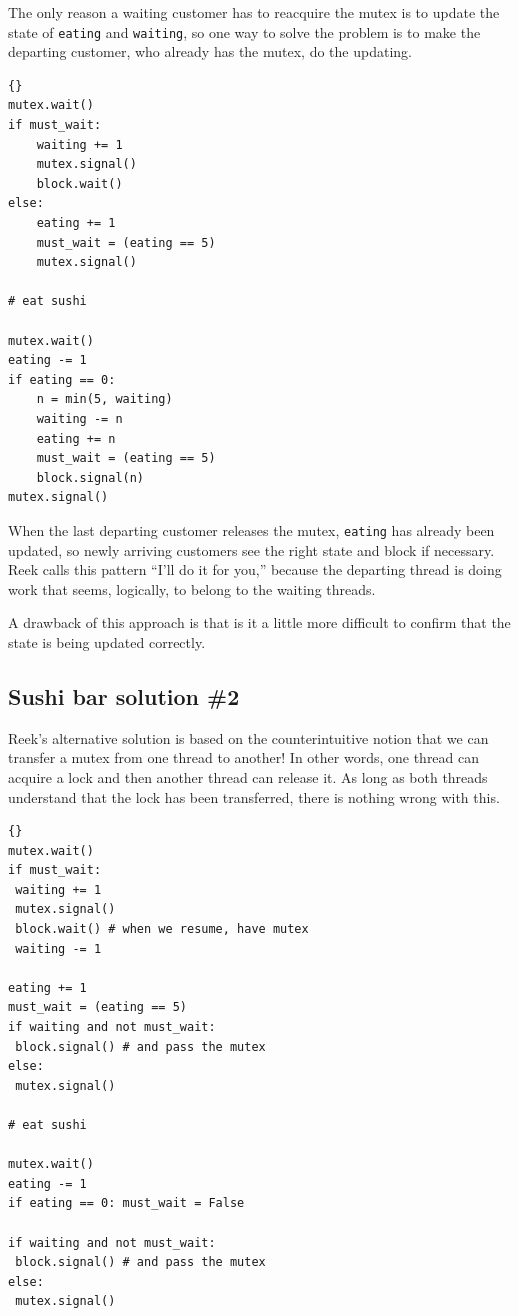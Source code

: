\documentclass{book}
\begin{document}
The only reason a waiting customer has to reacquire the mutex
is to update the state of {\tt eating} and {\tt waiting}, so
one way to solve the problem is to make the departing customer,
who already has the mutex, do the updating.

\newpage
\begin{lstlisting}[title={Sushi bar solution \#1}]{}
mutex.wait()
if must_wait:
    waiting += 1
    mutex.signal()
    block.wait()
else:
    eating += 1
    must_wait = (eating == 5)
    mutex.signal()

# eat sushi

mutex.wait()
eating -= 1
if eating == 0:
    n = min(5, waiting)
    waiting -= n
    eating += n
    must_wait = (eating == 5)
    block.signal(n)
mutex.signal()
\end{lstlisting}

When the last departing customer releases the mutex,
{\tt eating} has already been updated, so newly arriving customers
see the right state and block if necessary.  Reek calls this
pattern ``I'll do it for you,'' because the departing thread
is doing work that seems, logically, to belong to the waiting
threads.

A drawback of this approach is that is it a little more difficult
to confirm that the state is being updated correctly.



\subsection {Sushi bar solution \#2}

Reek's alternative solution is based on the counterintuitive
notion that we can transfer a mutex from one thread to another!
In other words, one thread can acquire a lock and then another
thread can release it.  As long as both threads understand
that the lock has been transferred, there is nothing wrong with
this.

\newpage
\begin{lstlisting}[title={Sushi bar solution \#2}]{}
mutex.wait()
if must_wait:
 waiting += 1
 mutex.signal()
 block.wait() # when we resume, have mutex
 waiting -= 1

eating += 1
must_wait = (eating == 5)
if waiting and not must_wait:
 block.signal() # and pass the mutex
else:
 mutex.signal()

# eat sushi

mutex.wait()
eating -= 1
if eating == 0: must_wait = False

if waiting and not must_wait:
 block.signal() # and pass the mutex
else:
 mutex.signal()
\end{lstlisting}
\end{document}
